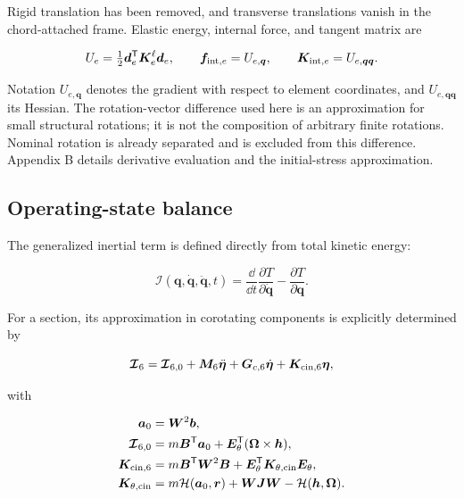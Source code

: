 Rigid translation has been removed, and transverse translations vanish in the chord-attached frame. Elastic energy, internal force, and tangent matrix are

\begin{equation}
U_e=\tfrac12\bm d_e^\mathsf T\bm K_e^\ell\bm d_e,\qquad
\bm f_{{\rm int},e}=U_{e,\bm q},\qquad
\bm K_{{\rm int},e}=U_{e,\bm q\bm q}.
\label{eq:corot}
\end{equation}

Notation $U_{e,\bm q}$ denotes the gradient with respect to element coordinates, and $U_{e,\bm q\bm q}$ its Hessian. The rotation-vector difference used here is an approximation for small structural rotations; it is not the composition of arbitrary finite rotations. Nominal rotation is already separated and is excluded from this difference. Appendix B details derivative evaluation and the initial-stress approximation.

\subsection{Operating-state balance}
The generalized inertial term is defined directly from total kinetic energy:

\begin{equation}
\bm{\mathcal I}(\bm q,\dot{\bm q},\ddot{\bm q},t)
=\frac{\dd}{\dd t}\frac{\partial T}{\partial\dot{\bm q}}
-\frac{\partial T}{\partial\bm q}.
\label{eq:inercia-generalizada}
\end{equation}

For a section, its approximation in corotating components is explicitly determined by

\begin{equation}
\bm{\mathcal I}_6=
\bm{\mathcal I}_{6,0}
+\bm M_6\ddot{\bm\eta}
+\bm G_{c,6}\dot{\bm\eta}
+\bm K_{{\rm cin},6}\bm\eta,
\label{eq:balance-inercial}
\end{equation}

with

\begin{align}
\bm a_0&=\bm W^2\bm b,\nonumber\\
\bm{\mathcal I}_{6,0}
&=m\bm B^\mathsf T\bm a_0+\bm E_\theta^\mathsf T(\bm\Omega\times\bm h),\nonumber\\
\bm K_{{\rm cin},6}
&=m\bm B^\mathsf T\bm W^2\bm B
+\bm E_\theta^\mathsf T\bm K_{\theta,{\rm cin}}\bm E_\theta,\nonumber\\
\bm K_{\theta,{\rm cin}}
&=m\mathcal H(\bm a_0,\bm r)+\bm W\bm J\bm W
-\mathcal H(\bm h,\bm\Omega).
\label{eq:tangente-inercial}
\end{align}

